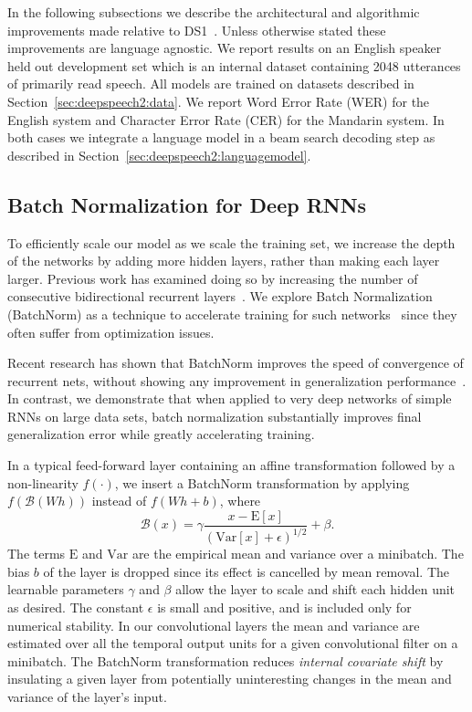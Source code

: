 In the following subsections we describe the architectural and algorithmic
improvements made relative to DS1~\cite{hannun2014deepspeech}.  Unless
otherwise stated these improvements are language agnostic. We report results on
an English speaker held out development set which is an internal dataset
containing 2048 utterances of primarily read speech. All models are trained on
datasets described in Section~\ref{sec:deepspeech2:data}. We report Word Error
Rate (WER) for the English system and Character Error Rate (CER) for the
Mandarin system. In both cases we integrate a language model in a beam search
decoding step as described in Section~\ref{sec:deepspeech2:languagemodel}.


\subsection{Batch Normalization for Deep RNNs}
\label{sec:deepspeech2:bn}

To efficiently scale our model as we scale the training set, we increase the
depth of the networks by adding more hidden layers, rather than making each
layer larger. Previous work has examined doing so by increasing the number of
consecutive bidirectional recurrent layers~\cite{graves2013}. We explore Batch
Normalization (BatchNorm) as a technique to accelerate training for such
networks~\cite{ioffe2015batch} since they often suffer from optimization
issues. 

Recent research has shown that BatchNorm improves the speed of convergence of
recurrent nets, without showing any improvement in generalization
performance~\cite{laurent2016}. In contrast, we demonstrate that when applied
to very deep networks of simple RNNs on large data sets, batch normalization
substantially improves final generalization error while greatly accelerating
training. 

In a typical feed-forward layer containing an affine transformation followed by
a non-linearity $f(\cdot)$, we insert a BatchNorm transformation by applying
$f(\mathcal{B}(Wh))$ instead of $f(Wh + b)$, where
\begin{equation*}
    \mathcal{B}(x) = \gamma 
        \frac{x - \mathrm{E}[x]}{\left(\mathrm{Var}[x] + \epsilon\right)^{1/2}} + \beta.
\end{equation*}
The terms $\mathrm{E}$ and $\mathrm{Var}$ are the empirical mean and variance
over a minibatch. The bias $b$ of the layer is dropped since its effect is
cancelled by mean removal. The learnable parameters $\gamma$ and $\beta$ allow
the layer to scale and shift each hidden unit as desired. The constant
$\epsilon$ is small and positive, and is included only for numerical stability.
In our convolutional layers the mean and variance are estimated over all the
temporal output units for a given convolutional filter on a minibatch. The
BatchNorm transformation reduces \emph{internal covariate shift} by insulating
a given layer from potentially uninteresting changes in the mean and variance
of the layer's input.

